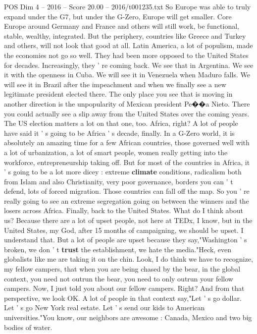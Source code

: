\begin{textsample}{POS Dim 4 – 2016 – Score 20.00 – 2016/t001235.txt}
So Europe was able to truly expand under the G7, but under the G-Zero, Europe will get smaller.
Core Europe around Germany and France and others will still work, be functional, stable, wealthy, integrated.
But the periphery, countries like Greece and Turkey and others, will not look that good at all.
Latin America, a lot of populism, made the economies not go so well.
They had been more opposed to the United States for decades.
Increasingly, they ' re coming back.
We see that in Argentina.
We see it with the openness in Cuba.
We will see it in Venezuela when Maduro falls.
We will see it in Brazil after the impeachment and when we finally see a new legitimate president elected there.
The only place you see that is moving in another direction is the unpopularity of Mexican president Pe{\EmojiFont �}{\EmojiFont �}a Nieto.
There you could actually see a slip away from the United States over the coming years.
The US election matters a lot on that one, too.
Africa, right?
A lot of people have said it ' s going to be Africa ' s decade, finally.
In a G-Zero world, it is absolutely an amazing time for a few African countries, those governed well with a lot of urbanization, a lot of smart people, women really getting into the workforce, entrepreneurship taking off.
But for most of the countries in Africa, it ' s going to be a lot more dicey : extreme \textbf{climate} conditions, radicalism both from Islam and also Christianity, very poor governance, borders you can ' t defend, lots of forced migration.
Those countries can fall off the map.
So you ' re really going to see an extreme segregation going on between the winners and the losers across Africa.
Finally, back to the United States.
What do I think about us?
Because there are a lot of upset people, not here at TEDx, I know, but in the United States, my God, after 15 months of campaigning, we should be upset.
I understand that.
But a lot of people are upset because they say,"Washington ' s broken, we don ' t \textbf{trust} the establishment, we hate the media."Heck, even globalists like me are taking it on the chin.
Look, I do think we have to recognize, my fellow campers, that when you are being chased by the bear, in the global context, you need not outrun the bear, you need to only outrun your fellow campers.
Now, I just told you about our fellow campers.
Right?
And from that perspective, we look OK.
A lot of people in that context say,"Let ' s go dollar.
Let ' s go New York real estate.
Let ' s send our kids to American universities."You know, our neighbors are awesome : Canada, Mexico and two big bodies of water.

\end{textsample}
